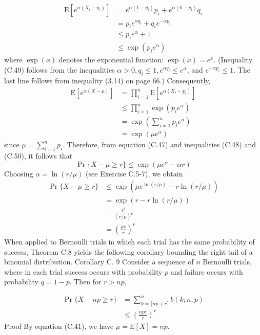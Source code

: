 \documentclass[lang=cn,newtx,10pt,scheme=chinese]{elegantbook}
\begin{document}
$$
\begin{aligned}
\mathrm{E}\left[e^{\alpha\left(X_i-p_i\right)}\right] & =e^{\alpha\left(1-p_i\right)} p_i+e^{\alpha\left(0-p_i\right)} q_i \\
& =p_i e^{\alpha q_i}+q_i e^{-\alpha p_i} \\
& \leq p_i e^\alpha+1 \\
& \leq \exp \left(p_i e^\alpha\right)
\end{aligned}
$$
where $\exp (x)$ denotes the exponential function: $\exp (x)=e^x$. (Inequality (C.49) follows from the inequalities $\alpha>0, q_i \leq 1, e^{\alpha q_i} \leq e^\alpha$, and $e^{-\alpha p_i} \leq 1$. The last line follows from inequality (3.14) on page 66.) Consequently,
$$
\begin{aligned}
\mathrm{E}\left[e^{\alpha(X-\mu)}\right] & =\prod_{i=1}^n \mathrm{E}\left[e^{\alpha\left(X_i-p_i\right)}\right] \\
& \leq \prod_{i=1}^n \exp \left(p_i e^\alpha\right) \\
& =\exp \left(\sum_{i=1}^n p_i e^\alpha\right) \\
& =\exp \left(\mu e^\alpha\right)
\end{aligned}
$$
since $\mu=\sum_{i=1}^n p_i$. Therefore, from equation (C.47) and inequalities (C.48) and (C.50), it follows that
$$
\operatorname{Pr}\{X-\mu \geq r\} \leq \exp \left(\mu e^\alpha-\alpha r\right)
$$
Choosing $\alpha=\ln (r / \mu)$ (see Exercise C.5-7), we obtain
$$
\begin{aligned}
\operatorname{Pr}\{X-\mu \geq r\} & \leq \exp \left(\mu e^{\ln (r / \mu)}-r \ln (r / \mu)\right) \\
& =\exp (r-r \ln (r / \mu)) \\
& =\frac{e^r}{(r / \mu)^r} \\
& =\left(\frac{\mu e}{r}\right)^r
\end{aligned}
$$
When applied to Bernoulli trials in which each trial has the same probability of success, Theorem C.8 yields the following corollary bounding the right tail of a binomial distribution.
Corollary C. 9
Consider a sequence of $n$ Bernoulli trials, where in each trial success occurs with probability $p$ and failure occurs with probability $q=1-p$. Then for $r>n p$,

$$
\begin{aligned}
\operatorname{Pr}\{X-n p \geq r\} & =\sum_{k=\lceil n p+r\rceil}^n b(k ; n, p) \\
& \leq\left(\frac{n p e}{r}\right)^r
\end{aligned}
$$
Proof By equation (C.41), we have $\mu=\mathrm{E}[X]=n p$.
\end{document}
